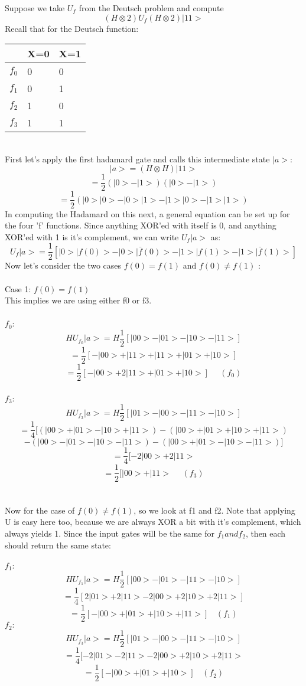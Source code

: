 \documentclass[12pt]{article}
\begin{document}
Suppose we take $U_{f}$ from the Deutsch problem and compute
$$(H\otimes 2)U_{f} (H\otimes 2)|11>$$
Recall that for the Deutsch function:
\\
\begin{table}[h]
\centering
    \begin{tabular}{|l|l|l|}
        \hline
        ~  & X=0 & X=1 \\ \hline
        $f_{0}$ & 0   & 0   \\ \hline
        $f_{1}$ & 0   & 1   \\  \hline
        $f_{2}$ & 1   & 0   \\ \hline
        $f_{3}$ & 1   & 1   \\
        \hline
    \end{tabular}
\end{table}
\\
First let's apply the first hadamard gate and calls this intermediate state $|a>$:
$$|a> = (H\otimes H)|11>$$
$$= \frac{1}{2} (|0> - |1>)(|0> - |1>)$$
$$=\frac{1}{2}(|0>|0> - |0>|1> - |1>|0> - |1>|1>)$$
In computing the Hadamard on this next, a general equation can be set up for the four 'f' functions. Since anything XOR'ed with itself is 0, and anything XOR'ed with 1 is it's complement, we can write $U_{f}|a>$ as:
$$U_{f}|a> = \frac{1}{2}[|0>|f(0)> - |0>|\bar{f}(0)> - |1>|f(1)> - |1>|\bar{f}(1)>] $$
Now let's consider the two cases $f(0)=f(1)$ and $f(0) \neq f(1)$ :
\\\\ Case 1: $f(0)=f(1)$
\\This implies we are using either f0 or f3.
\\\\$f_{0}$:
$$ HU_{f_{0}}|a> = H \frac{1}{2}[|00> - |01> - |10> - |11>]$$
$$  = \frac{1}{2}[-|00> + |11> + |11> + |01> + |10>]$$
\[
\boxed{ = \frac{1}{2}[-|00> + 2|11> + |01> + |10>] \>\>\>\>\>\>(f_{0}) }
\] 
\\$f_{3}$:
$$ HU_{f_{3}}|a> = H  \frac{1}{2}[|01> - |00> - |11> - |10>]$$
$$ = \frac{1}{4}[ (|00> + |01> - |10> + |11>) -  (|00> + |01> + |10> + |11>)$$$$- (|00> - |01> - |10> - |11>) - (|00> + |01> - |10> - |11>)]$$
$$ = \frac{1}{4}[-2|00> + 2|11>$$
\[
\boxed{ = \frac{1}{2}[|00> + |11> 	\>\>\>\>\>\>(f_{3})}
\]
\\\\
Now for the case of $f(0) \neq f(1)$, so we look at f1 and f2. Note that applying U is easy here too, because we are always XOR a bit with it's complement, which always yields 1. Since the input gates will be the same for $f_{1} and f_{2}$, then each should return the same state:
\\\\
$f_{1}:$
$$ HU_{f_1}|a> = H \frac{1}{2}[|00> - |01> - |11> - |10>]  $$
$$ = \frac{1}{4}[2|01> + 2|11> - 2|00> + 2|10> + 2|11>] $$
\[
\boxed{ = \frac{1}{2}[-|00> + |01> + |10> + |11>] \>\>\>\> (f_{1}) }
\]
$f_{2}:$
$$ HU_{f_3} |a> = H \frac{1}{2}[|01> - |00> - |11> - |10>]$$
$$ = \frac{1}{4}[-2|01> - 2|11> - 2|00> + 2|10> + 2|11> $$
\[
\boxed{ = \frac{1}{2}[-|00> + |01> + |10>] \>\>\>\>(f_{2})}
\]\
\end{document}

